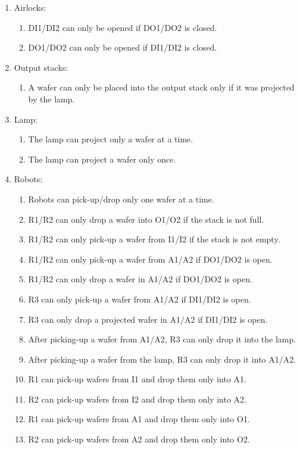 \begin{enumerate}
\item Airlocks:
    \begin{enumerate}
    \item DI1/DI2 can only be opened if DO1/DO2 is closed.
    \item DO1/DO2 can only be opened if DI1/DI2 is closed.
    \end{enumerate}

\newpage

\item Output stacks:
    \begin{enumerate}
    \item A wafer can only be placed into the output stack only if it was projected by the lamp.
    \end{enumerate}

\item Lamp:
    \begin{enumerate}
    \item The lamp can project only a wafer at a time.
    \item The lamp can project a wafer only once.
    \end{enumerate}
    
\item Robots:
    \begin{enumerate}
    \item Robots can pick-up/drop only one wafer at a time.
    \item R1/R2 can only drop a wafer into O1/O2 if the stack is not full.
    \item R1/R2 can only pick-up a wafer from I1/I2 if the stack is not empty.
    \item R1/R2 can only pick-up a wafer from A1/A2 if DO1/DO2 is open.
    \item R1/R2 can only drop a wafer in A1/A2 if DO1/DO2 is open.
    \item R3 can only pick-up a wafer from A1/A2 if DI1/DI2 is open.
    \item R3 can only drop a projected wafer in A1/A2 if DI1/DI2 is open.
    \item After picking-up a wafer from A1/A2, R3 can only drop it into the lamp.
    \item After picking-up a wafer from the lamp, R3 can only drop it into A1/A2.
    \item R1 can pick-up wafers from I1 and drop them only into A1.
    \item R2 can pick-up wafers from I2 and drop them only into A2.
    \item R1 can pick-up wafers from A1 and drop them only into O1.
    \item R2 can pick-up wafers from A2 and drop them only into O2.
    \end{enumerate}
\end{enumerate}

